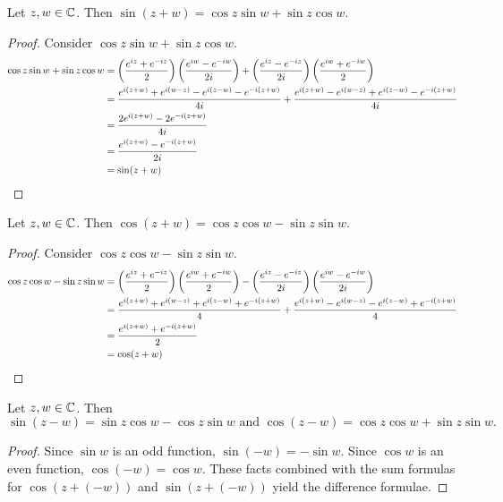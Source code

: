 \documentclass[notitlepage]{problem-solving}
\begin{document}
\begin{thm}
	Let $z,w\in\mathbb{C}$.
	Then $\sin(z+w)=\cos z\sin w+\sin z\cos w$.
\end{thm}
\begin{proof}
	Consider $\cos z\sin w+\sin z\cos w$.
	\begin{align*}
		\cos z\sin w+\sin z\cos w &=
		\left( \frac{e^{iz}+e^{-iz}}{2} \right)\left( \frac{e^{iw}-e^{-iw}}{2i} \right)+\left( \frac{e^{iz}-e^{-iz}}{2i} \right)\left( \frac{e^{iw}+e^{-iw}}{2} \right)\\
		&= \frac{e^{i(z+w)} +e^{i(w-z)} - e^{i(z-w)} - e^{-i(z+w)}}{4i} + \frac{e^{i(z+w)} -e^{i(w-z)} + e^{i(z-w)} - e^{-i(z+w)}}{4i}\\
		&= \frac{2e^{i(z+w)}-2e^{-i(z+w)}}{4i}\\
		&= \frac{e^{i(z+w)}-e^{-i(z+w)}}{2i}\\
		&= \sin(z+w)
	\end{align*}
\end{proof}

\begin{thm}
	Let $z,w\in\mathbb{C}$.
	Then $\cos(z+w)=\cos z\cos w - \sin z\sin w$.
\end{thm}
\begin{proof}
	Consider $\cos z\cos w - \sin z\sin w$.
	\begin{align*}
		\cos z\cos w - \sin z\sin w &=
		\left( \frac{e^{iz}+e^{-iz}}{2} \right)\left( \frac{e^{iw}+e^{-iw}}{2} \right) - \left( \frac{e^{iz}-e^{-iz}}{2i} \right)\left( \frac{e^{iw}-e^{-iw}}{2i} \right)\\
		&= \frac{e^{i(z+w)} + e^{i(w-z)} + e^{i(z-w)} + e^{-i(z+w)}}{4} + \frac{e^{i(z+w)} -e^{i(w-z)} - e^{i(z-w)} + e^{-i(z+w)}}{4}\\
		&= \frac{e^{i(z+w)}+e^{-i(z+w)}}{2}\\
		&= \cos(z+w)
	\end{align*}
\end{proof}

\begin{corollary}
	Let $z,w\in\mathbb{C}$.
	Then
	\[
		\sin(z-w)=\sin z\cos w - \cos z\sin w \text{ and }\cos(z-w)=\cos z\cos w + \sin z\sin w.
	\]
\end{corollary}
\begin{proof}
	Since $\sin w$ is an odd function, $\sin(-w)=-\sin w$.
	Since $\cos w$ is an even function, $\cos (-w)=\cos w$.
	These facts combined with the sum formulas for $\cos(z+(-w))$ and $\sin(z+(-w))$ yield the difference formulae.
\end{proof}

\printbibliography
\end{document}
